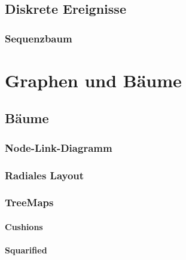         \subsection{Diskrete Ereignisse} %

            \subsubsection{Sequenzbaum} %

    \section{Graphen und Bäume} %

        \subsection{Bäume} %

            \subsubsection{Node-Link-Diagramm} %

            \subsubsection{Radiales Layout} %

            \subsubsection{TreeMaps} %

                \paragraph{Cushions} %

                \paragraph{Squarified} %

